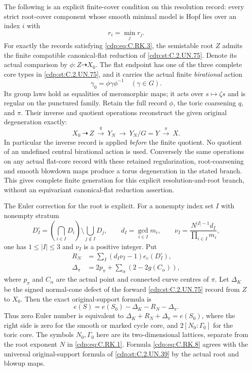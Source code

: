 \begin{proposition}
The following is an explicit finite-cover condition
on this resolution record: every strict root-cover
component whose smooth minimal model is Hopf lies
over an index $i$ with
\[
                            r_i=\min_j r_j.
\tag{C.RK.3}\label{cdp:eq:C.RK.3}
\]
For exactly the records satisfying \eqref{cdp:eq:C.RK.3}, the
semistable root $Z$ admits the finite compatible
canonical-flat reduction of \ref{cdp:st:C.2.UN.75}. Denote its
actual comparison by $\phi:Z\dashrightarrow X_0$.
The flat endpoint has one of the three complete
core types in \ref{cdp:st:C.2.UN.75}, and it carries the actual
finite \emph{birational} action
\[
                 \gamma_0=\phi\gamma\phi^{-1}
                 \quad (\gamma\in G).
\tag{C.RK.4}\label{cdp:eq:C.RK.4}
\]
Its group laws hold as equalities of meromorphic
maps; it acts over $s\mapsto\zeta s$ and is regular
on the punctured family. Retain the full record
$\phi$, the toric coarsening $q$, and $\pi$.
Their inverse and quotient operations reconstruct
the given original degeneration exactly:
\[
 X_0\ \dashrightarrow\ Z\ \xrightarrow{q}\ Y_N
       \ \longrightarrow\ Y_N/G=Y
       \ \xrightarrow{\pi}\ X.
\tag{C.RK.5}\label{cdp:eq:C.RK.5}
\]
In particular the inverse record is applied
\emph{before} the finite quotient. No quotient of
an undefined central birational action is used.
Conversely the same operations on any actual
flat-core record with these retained regularization,
root-coarsening and smooth blowdown maps produce
a torus degeneration in the stated branch.
This gives complete finite generation for this
explicit resolution-and-root branch, without
an equivariant canonical-flat reduction assertion.

The Euler correction for the root is explicit.
For a nonempty index set $I$ with nonempty stratum
\[
 D_I^\circ=
    \left(\bigcap_{i\in I}D_i\right)
           \setminus\bigcup_{j\notin I}D_j,
 \qquad d_I=\gcd_{i\in I}m_i,
 \qquad \nu_I=\frac{N^{|I|-1}d_I}{\prod_{i\in I}m_i},
\tag{C.RK.6}\label{cdp:eq:C.RK.6}
\]
one has $1\le|I|\le3$ and $\nu_I$ is a positive
integer. Put
\[
 \begin{split}
 R_N&=\sum_I(d_I\nu_I-1)e_c(D_I^\circ),\\
 \Delta_\pi&=2p_\pi+
                   \sum_\alpha(2-2g(C_\alpha)),
 \end{split}
\tag{C.RK.7}\label{cdp:eq:C.RK.7}
\]
where $p_\pi$ and $C_\alpha$ are the actual point
and connected curve centres of $\pi$. Let
$\Delta_K$ be the signed normal-cone defect of
the forward \ref{cdp:st:C.2.UN.75} record from $Z$ to $X_0$.
Then the exact original-support formula is
\[
                e(S)=e(S_0)-\Delta_K-R_N-\Delta_\pi.
\tag{C.RK.8}\label{cdp:eq:C.RK.8}
\]
Thus zero Euler number is equivalent to
$\Delta_K+R_N+\Delta_\pi=e(S_0)$, where the
right side is zero for the smooth or marked
cycle core, and $2[N_0:\Gamma_0]$ for the
toric core. The symbols $N_0,\Gamma_0$ here
are its two-dimensional lattices, separate
from the root exponent $N$ in \eqref{cdp:eq:C.RK.1}.
Formula \eqref{cdp:eq:C.RK.8} agrees with the universal
original-support formula of \ref{cdp:st:C.2.UN.39} by the
actual root and blowup maps.


\end{proposition}
